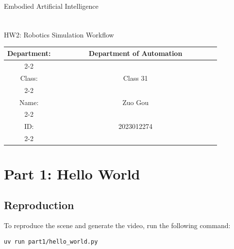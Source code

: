 \documentclass[UTF8]{ctexart}
\begin{document}
\begin{titlepage}
     \begin{center}
        \quad \\
        \quad \\
        \quad \\
        \quad \\
        \quad \\
        \quad \\
        \quad \\
        \quad \\ 
        \quad \\ 
        {\kaishu \fontsize{30}{15}\selectfont Embodied Artificial Intelligence}\\
        \quad \\
        \quad \\
        {\kaishu \fontsize{30}{15}\selectfont HW2: Robotics Simulation Workflow}\\

        \end{center}
        \vskip 8cm

        \begin{center}
        \begin{large}
        \begin{tabular}{cc}
        Department:& ~~~~~~~~Department of Automation~~~~~~~~      \\
        \cline{2-2}\\
        Class:& ~~~~~~~~Class 31~~~~~~~~      \\
        \cline{2-2}\\
        Name:& Zuo Gou    \\
        \cline{2-2}\\
        ID:&2023012274   \\
        \cline{2-2}
          \end{tabular}
        \end{large}
      \end{center}

\end{titlepage}
\newpage

\section{Part 1: Hello World}

\subsection{Reproduction}
To reproduce the scene and generate the video, run the following command:
\begin{lstlisting}[language=bash,xleftmargin=2em]
uv run part1/hello_world.py
\end{lstlisting}
\end{document}
